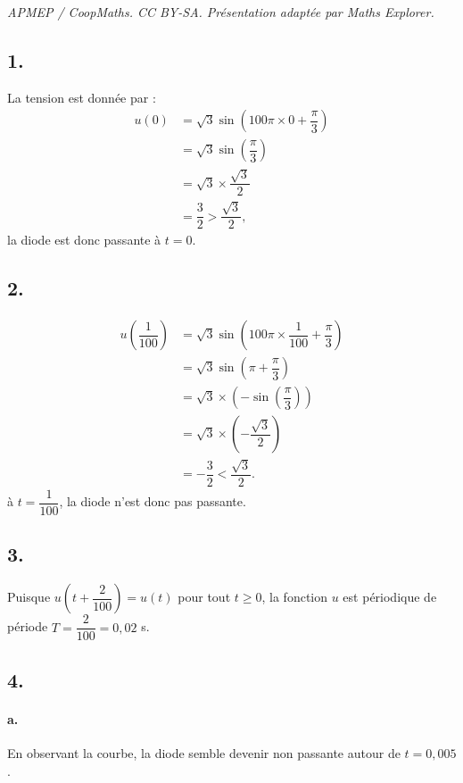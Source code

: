 \documentclass[10pt]{article}
\begin{document}
\noindent\textit{APMEP / CoopMaths. CC BY-SA. Présentation adaptée par Maths Explorer.}\par\medskip
\subsection*{1.}

La tension est donnée par :
\begin{align*}
u(0) &= \sqrt{3} \sin\left(100\pi \times 0 + \dfrac{\pi}{3}\right) \\
&= \sqrt{3} \sin\left(\dfrac{\pi}{3}\right) \\
&= \sqrt{3} \times \dfrac{\sqrt{3}}{2} \\
&= \dfrac{3}{2} > \dfrac{\sqrt{3}}{2},
\end{align*}
la diode est donc passante à \( t = 0 \).

\subsection*{2.}

\begin{align*}
u\left(\dfrac{1}{100}\right) &= \sqrt{3} \sin\left(100\pi \times \dfrac{1}{100} + \dfrac{\pi}{3}\right) \\
&= \sqrt{3} \sin\left(\pi + \dfrac{\pi}{3}\right) \\
&= \sqrt{3} \times \left(-\sin \left(\dfrac{\pi}{3}\right)\right) \\
&= \sqrt{3} \times \left(- \dfrac{\sqrt{3}}{2}\right) \\
&= - \dfrac{3}{2} < \dfrac{\sqrt{3}}{2}.
\end{align*}
à \( t = \dfrac{1}{100} \), la diode n'est donc pas passante.

\subsection*{3.}

Puisque \( u\left(t + \dfrac{2}{100}\right) = u(t) \) pour tout \( t \geqslant 0 \), la fonction \( u \) est périodique de période \( T = \dfrac{2}{100} = 0{,}02 \) s.

\subsection*{4.}

\paragraph{a.} En observant la courbe, la diode semble devenir non passante autour de \( t = 0{,}005 \).
\end{document}
